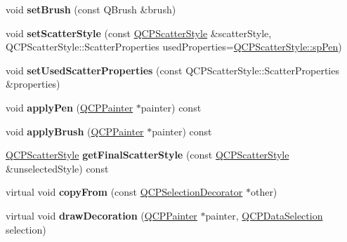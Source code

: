 \begin{DoxyCompactItemize}
void {\bfseries set\+Brush} (const Q\+Brush \&brush)
\item 
\mbox{\label{class_q_c_p_selection_decorator_ab403a613289714ff4fd4a0c0371ab116}} 
void {\bfseries set\+Scatter\+Style} (const \hyperlink{class_q_c_p_scatter_style}{Q\+C\+P\+Scatter\+Style} \&scatter\+Style, Q\+C\+P\+Scatter\+Style\+::\+Scatter\+Properties used\+Properties=\hyperlink{class_q_c_p_scatter_style_a8974f6a20f8f6eea7781f0e6af9deb46a1b8f3179d60006d2bcfd4e14a3fcde79}{Q\+C\+P\+Scatter\+Style\+::sp\+Pen})
\item 
\mbox{\label{class_q_c_p_selection_decorator_a808c1607cd4e83869c04986e332455c0}} 
void {\bfseries set\+Used\+Scatter\+Properties} (const Q\+C\+P\+Scatter\+Style\+::\+Scatter\+Properties \&properties)
\item 
\mbox{\label{class_q_c_p_selection_decorator_a75098893f7d08660ea449206810679d7}} 
void {\bfseries apply\+Pen} (\hyperlink{class_q_c_p_painter}{Q\+C\+P\+Painter} $\ast$painter) const
\item 
\mbox{\label{class_q_c_p_selection_decorator_a225544527d51b49546b70d0e6d655a34}} 
void {\bfseries apply\+Brush} (\hyperlink{class_q_c_p_painter}{Q\+C\+P\+Painter} $\ast$painter) const
\item 
\mbox{\label{class_q_c_p_selection_decorator_a1277b373248896bc70e8cc1de96da9fa}} 
\hyperlink{class_q_c_p_scatter_style}{Q\+C\+P\+Scatter\+Style} {\bfseries get\+Final\+Scatter\+Style} (const \hyperlink{class_q_c_p_scatter_style}{Q\+C\+P\+Scatter\+Style} \&unselected\+Style) const
\item 
\mbox{\label{class_q_c_p_selection_decorator_a06f487bf8fb0047f2ba3b6c3f63f80b3}} 
virtual void {\bfseries copy\+From} (const \hyperlink{class_q_c_p_selection_decorator}{Q\+C\+P\+Selection\+Decorator} $\ast$other)
\item 
\mbox{\label{class_q_c_p_selection_decorator_a52954b804ad581b5dedb9c331306b932}} 
virtual void {\bfseries draw\+Decoration} (\hyperlink{class_q_c_p_painter}{Q\+C\+P\+Painter} $\ast$painter, \hyperlink{class_q_c_p_data_selection}{Q\+C\+P\+Data\+Selection} selection)
\end{DoxyCompactItemize}
